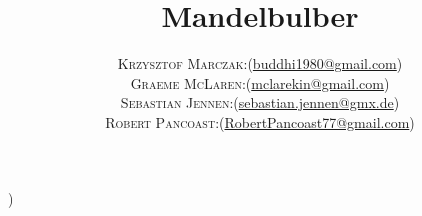 % 
%





\newcommand{\mTitle}{Mandelbulber}
\newcommand{\mSubtitle}{End User Manual}
\newcommand{\mVersionDocument}{2.11.0.9.5}
\newcommand{\mDateDocument}{2017-April}\left) 
\newcommand{\mAuthor}{	
\begin{tabular}{r|p{11cm}}
	\textsc{Krzysztof Marczak:}
		& (\href{mailto:buddhi1980@gmail.com}
		{buddhi1980@gmail.com}) \\
	\textsc{Graeme McLaren:}
		& (\href{mailto:mclarekin@gmail.com}
		{mclarekin@gmail.com}) \\
	\textsc{Sebastian Jennen:}
		& (\href{mailto:sebastian.jennen@gmx.de}
		{sebastian.jennen@gmx.de}) \\
	\textsc{Robert Pancoast:}
		& (\href{mailto:RobertPancoast77@gmail.com}
		{RobertPancoast77@gmail.com})
\end{tabular}}


\title{\mTitle}
\author{\mAuthor}




